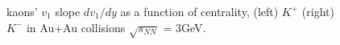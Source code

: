 \begin{figure}[h]
\centering
{}
\caption{\label{kaon_dv1dy_cent} kaons' $v_{1}$ slope $dv_{1}/dy$ as a function of centrality, (left) $K^{+}$ (right) $K^{-}$ in Au+Au collisions $\sqrt{s_{NN}}$ = 3GeV.}
\end{figure}

